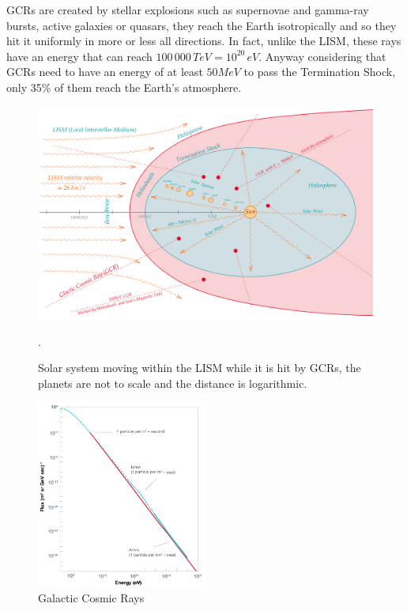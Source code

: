 {{{{{						GCRs are created by stellar explosions such as supernovae and gamma-ray bursts, active galaxies or quasars, they reach the Earth isotropically and so they hit it uniformly in more or less all directions. 
						In fact, unlike the LISM, these rays have an energy that can reach $100\,000\,TeV = 10^{20}\,eV$. Anyway considering that GCRs need to have an energy of at least $50MeV$ to pass the Termination Shock, only 35\% of them reach the Earth's atmosphere.\\
						\begin{figure}[H]
							\centering
							\includegraphics[scale=0.16,center]{./images/SolarSystem_GCRs.png}
							\caption{Solar system moving within the LISM while it is hit by GCRs, the planets are not to scale and the distance is logarithmic.}.
							\label{fig:SolarSystemGCRs}
						\end{figure} 
						
						\begin{figure}
								\includegraphics[width=0.5\textwidth]{./images/Flux_of_cosmic_rays.png}
								\caption{Galactic Cosmic Rays }
								\label{fig:GCR_Spectrum}
						\end{figure}
					
}}}}}
